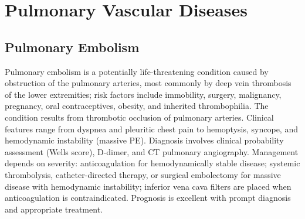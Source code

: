 \section{Pulmonary Vascular Diseases}








\label{sec:Pulmonary Vascular Diseases}

\subsection{Pulmonary Embolism}
\label{sec:Pulmonary Embolism}
Pulmonary embolism is a potentially life-threatening condition caused by obstruction of the pulmonary arteries, most commonly by deep vein thrombosis of the lower extremities; risk factors include immobility, surgery, malignancy, pregnancy, oral contraceptives, obesity, and inherited thrombophilia. The condition results from thrombotic occlusion of pulmonary arteries. Clinical features range from dyspnea and pleuritic chest pain to hemoptysis, syncope, and hemodynamic instability (massive PE). Diagnosis involves clinical probability assessment (Wells score), D-dimer, and CT pulmonary angiography. Management depends on severity: anticoagulation for hemodynamically stable disease; systemic thrombolysis, catheter-directed therapy, or surgical embolectomy for massive disease with hemodynamic instability; inferior vena cava filters are placed when anticoagulation is contraindicated. Prognosis is excellent with prompt diagnosis and appropriate treatment.

